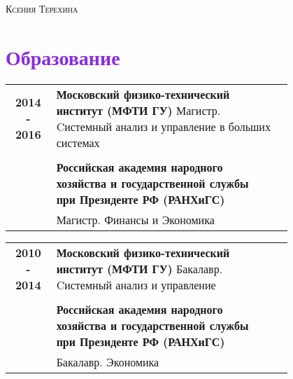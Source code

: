 \documentclass[a4paper, oneside, final]{scrartcl} %
\newcommand{\gray}{\rowcolor[gray]{.93}} %
\begin{document}
\begin{center} %


{\fontsize{24}{24}\selectfont\scshape Ксения Терехина} %




\section{\textbf{\textcolor{BlueViolet}{Образование}}}

\begin{tabularx}{0.99\linewidth}{cp{0.8\linewidth}l}
\gray \textbf{2014 - 2016} & \textbf{Московский физико-технический институт (МФТИ ГУ)} {Магистр. Cистемный анализ и управление в больших системах} \\
\gray & \quad \\
\gray & \textbf{Российская академия народного хозяйства и государственной службы при Президенте РФ (РАНХиГС) } \\ 
\gray & Магистр. Финансы и Экономика \\
 
\end{tabularx}

\vspace{10pt}
\begin{tabularx}{0.99\linewidth}{cp{0.8\linewidth}l}
\gray \textbf{2010 - 2014} & \textbf{Московский физико-технический институт (МФТИ ГУ)} {Бакалавр. Cистемный анализ и управление } \\
\gray  & \quad \\
\gray  & \textbf{Российская академия народного хозяйства и государственной службы при Президенте РФ (РАНХиГС) } \\
\gray  & {Бакалавр. Экономика}\\
 
\end{tabularx}



\end{center}
\end{document}
